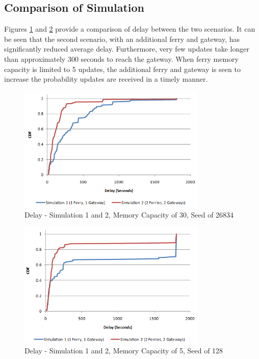 \subsection{Comparison of Simulation}

Figures \ref{fig:result_delay_both_128_mc30} and \ref{fig:result_delay_both_128_mc5} provide a comparison of delay between the two scenarios.
It can be seen that the second scenario, with an additional ferry and gateway, has significantly reduced average delay.
Furthermore, very few updates take longer than approximately 300 seconds to reach the gateway.
When ferry memory capacity is limited to 5 updates, the additional ferry and gateway is seen to increase the probability updates are received in a timely manner.

\begin{figure}[htbp]
    \centering
    \includegraphics[width=0.8\textwidth]{images/result_delay_both_128_mc30.png}
    \caption{Delay - Simulation 1 and 2, Memory Capacity of 30, Seed of 26834}
    \label{fig:result_delay_both_128_mc30}
\end{figure}


\begin{figure}[htbp]
    \centering
    \includegraphics[width=0.8\textwidth]{images/result_delay_both_128_mc5.png}
    \caption{Delay - Simulation 1 and 2, Memory Capacity of 5, Seed of 128}
    \label{fig:result_delay_both_128_mc5}
\end{figure}